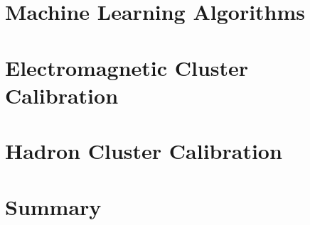 \documentclass
[
]
{thesis}
\begin{document}
\chapter{Machine Learning Algorithms}
   
\chapter{Electromagnetic Cluster Calibration}

\chapter{Hadron Cluster Calibration} 

\chapter{Summary}




%

%

%




\end{document}
